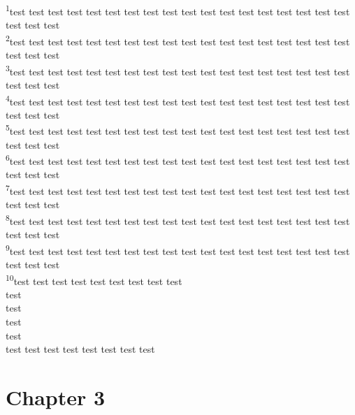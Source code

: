 \documentclass[10pt,twocolumn]{memoir}
\newcommand{\verseref}[2]{\textsuperscript{#2}}
\begin{document}
\noindent
\verseref{2}{1}test test test test test test test test test test test test test test test test test test test test test\\ 
\verseref{2}{2}test test test test test test test test test test test test test test test test test test test test test\\ 
\verseref{2}{3}test test test test test test test test test test test test test test test test test test test test test\\ 
\verseref{2}{4}test test test test test test test test test test test test test test test test test test test test test\\ 
\verseref{2}{5}test test test test test test test test test test test test test test test test test test test test test\\ 
\verseref{2}{6}test test test test test test test test test test test test test test test test test test test test test\\ 
\verseref{2}{7}test test test test test test test test test test test test test test test test test test test test test\\ 
\verseref{2}{8}test test test test test test test test test test test test test test test test test test test test test\\ 
\verseref{2}{9}test test test test test test test test test test test test test test test test test test test test test\\ 
\verseref{2}{10}test test test test test test test test test\\ test\\ test\\ test\\ test\\ test test test test test test test test\\

\section*{Chapter 3}
\end{document}
